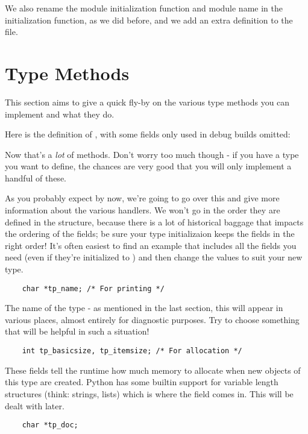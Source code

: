 We also rename the module initialization function and module name in
the initialization function, as we did before, and we add an extra
definition to the  file.

\section{Type Methods
         \label{dnt-type-methods}}

This section aims to give a quick fly-by on the various type methods
you can implement and what they do.

Here is the definition of , with some fields only
used in debug builds omitted:



Now that's a \emph{lot} of methods.  Don't worry too much though - if
you have a type you want to define, the chances are very good that you
will only implement a handful of these.

As you probably expect by now, we're going to go over this and give
more information about the various handlers.  We won't go in the order
they are defined in the structure, because there is a lot of
historical baggage that impacts the ordering of the fields; be sure
your type initializaion keeps the fields in the right order!  It's
often easiest to find an example that includes all the fields you need
(even if they're initialized to ) and then change the values
to suit your new type.

\begin{verbatim}
    char *tp_name; /* For printing */
\end{verbatim}

The name of the type - as mentioned in the last section, this will
appear in various places, almost entirely for diagnostic purposes.
Try to choose something that will be helpful in such a situation!

\begin{verbatim}
    int tp_basicsize, tp_itemsize; /* For allocation */
\end{verbatim}

These fields tell the runtime how much memory to allocate when new
objects of this type are created.  Python has some builtin support
for variable length structures (think: strings, lists) which is where
the  field comes in.  This will be dealt with
later.

\begin{verbatim}
    char *tp_doc;
\end{verbatim}

